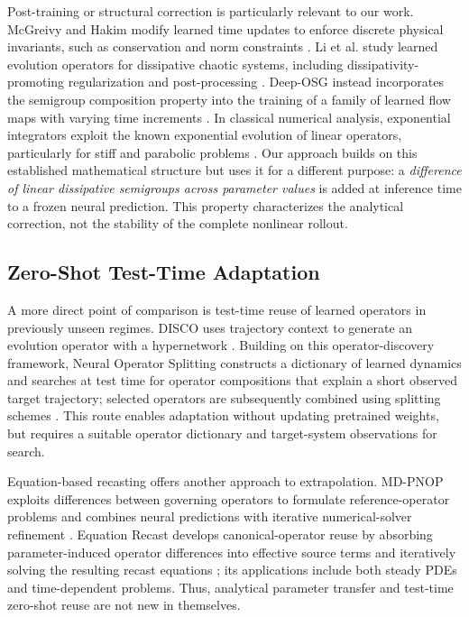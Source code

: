 \documentclass[10pt,twocolumn]{article}
\begin{document}
Post-training or structural correction is particularly relevant to our work. McGreivy and Hakim modify learned time updates to enforce discrete physical invariants, such as conservation and norm constraints \cite{mcgreivy2023invariants}. Li et al. study learned evolution operators for dissipative chaotic systems, including dissipativity-promoting regularization and post-processing \cite{li2022chaotic}. Deep-OSG instead incorporates the semigroup composition property into the training of a family of learned flow maps with varying time increments \cite{chen2023deeposg}. In classical numerical analysis, exponential integrators exploit the known exponential evolution of linear operators, particularly for stiff and parabolic problems \cite{hochbruck2010exponential}. Our approach builds on this established mathematical structure but uses it for a different purpose: a \emph{difference of linear dissipative semigroups across parameter values} is added at inference time to a frozen neural prediction. This property characterizes the analytical correction, not the stability of the complete nonlinear rollout.

\subsection{Zero-Shot Test-Time Adaptation}

A more direct point of comparison is test-time reuse of learned operators in previously unseen regimes. DISCO uses trajectory context to generate an evolution operator with a hypernetwork \cite{morel2025disco}. Building on this operator-discovery framework, Neural Operator Splitting constructs a dictionary of learned dynamics and searches at test time for operator compositions that explain a short observed target trajectory; selected operators are subsequently combined using splitting schemes \cite{serrano2026splitting}. This route enables adaptation without updating pretrained weights, but requires a suitable operator dictionary and target-system observations for search.

Equation-based recasting offers another approach to extrapolation. MD-PNOP exploits differences between governing operators to formulate reference-operator problems and combines neural predictions with iterative numerical-solver refinement \cite{cheng2026mdpnop}. Equation Recast develops canonical-operator reuse by absorbing parameter-induced operator differences into effective source terms and iteratively solving the resulting recast equations \cite{cheng2026recast}; its applications include both steady PDEs and time-dependent problems. Thus, analytical parameter transfer and test-time zero-shot reuse are not new in themselves.
\end{document}
